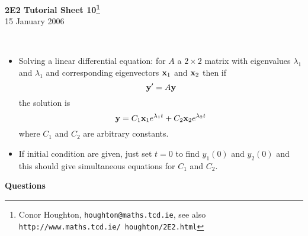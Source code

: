 \documentclass[12pt]{article}
\begin{document}
\begin{center}
{\bf 2E2 Tutorial Sheet 10\footnote{Conor Houghton, {\tt houghton@maths.tcd.ie}, see also {\tt http://www.maths.tcd.ie/ houghton/2E2.html}}}\\[1cm] 15 January 2006
\end{center}

\\
\begin{itemize}
\item Solving a linear differential equation: for $A$ a $2\times 2$ matrix with eigenvalues $\lambda_1$ and $\lambda_1$ and corresponding eigenvectors ${\bf x}_1$ and ${\bf x}_2$ then if
\begin{equation}
{\bf y}'=A{\bf y}
\end{equation}
the solution is
\begin{equation}
{\bf y}=C_1{\bf x}_1e^{\lambda_1t}+C_2{\bf x}_2e^{\lambda_2t}
\end{equation}
where $C_1$ and $C_2$ are arbitrary constants.
\item If initial condition are given, just set $t=0$ to find $y_1(0)$ and $y_2(0)$ and this should give simultaneous equations for $C_1$ and $C_2$.
\end{itemize}
\newpage
{\bf Questions}
\end{document}
